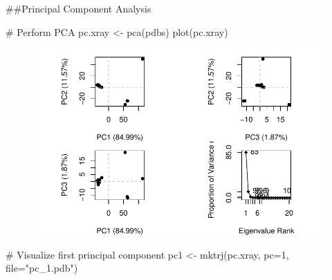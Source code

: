 \documentclass[
  letterpaper,
  DIV=11,
  numbers=noendperiod]{scrartcl}
\newenvironment{Shaded}{\begin{snugshade}}{\end{snugshade}}
\newcommand{\AttributeTok}[1]{\textcolor[rgb]{0.40,0.45,0.13}{#1}}
\newcommand{\CommentTok}[1]{\textcolor[rgb]{0.37,0.37,0.37}{#1}}
\newcommand{\DecValTok}[1]{\textcolor[rgb]{0.68,0.00,0.00}{#1}}
\newcommand{\FunctionTok}[1]{\textcolor[rgb]{0.28,0.35,0.67}{#1}}
\newcommand{\NormalTok}[1]{\textcolor[rgb]{0.00,0.23,0.31}{#1}}
\newcommand{\OtherTok}[1]{\textcolor[rgb]{0.00,0.23,0.31}{#1}}
\newcommand{\SpecialCharTok}[1]{\textcolor[rgb]{0.37,0.37,0.37}{#1}}
\newcommand{\StringTok}[1]{\textcolor[rgb]{0.13,0.47,0.30}{#1}}
\begin{document}
\begin{Shaded}
\end{Shaded}

\#\#Principal Component Analysis

\begin{Shaded}
\begin{Highlighting}[]
\CommentTok{\# Perform PCA}
\NormalTok{pc.xray }\OtherTok{\textless{}{-}} \FunctionTok{pca}\NormalTok{(pdbs)}
\FunctionTok{plot}\NormalTok{(pc.xray)}
\end{Highlighting}
\end{Shaded}

\begin{figure}[H]

{\centering \includegraphics{Class11INCLASS_files/figure-pdf/unnamed-chunk-11-1.pdf}

}

\end{figure}

\begin{Shaded}
\begin{Highlighting}[]
\CommentTok{\# Visualize first principal component}
\NormalTok{pc1 }\OtherTok{\textless{}{-}} \FunctionTok{mktrj}\NormalTok{(pc.xray, }\AttributeTok{pc=}\DecValTok{1}\NormalTok{, }\AttributeTok{file=}\StringTok{"pc\_1.pdb"}\NormalTok{)}
\end{Highlighting}
\end{Shaded}
\end{document}
